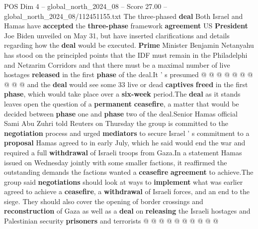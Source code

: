 \begin{textsample}{POS Dim 4 – global\_north\_2024\_08 – Score 27.00 – global\_north\_2024\_08/112451155.txt}
The three-phased \textbf{deal} Both Israel and Hamas have \textbf{accepted} the \textbf{three-phase} framework \textbf{agreement} US \textbf{President} Joe Biden unveiled on May 31, but have inserted clarifications and details regarding how the \textbf{deal} would be executed. \textbf{Prime} Minister Benjamin Netanyahu has stood on the principled points that the IDF must remain in the Philadelphi and Netzarim Corridors and that there must be a maximal number of live hostages \textbf{released} in the first \textbf{phase} of the deal.It ' s presumed @ @ @ @ @ @ @ @ @ @ and the \textbf{deal} would see some 33 live or dead \textbf{captives} \textbf{freed} in the first \textbf{phase}, which would take place over a \textbf{six-week} period.The \textbf{deal} as it stands leaves open the question of a \textbf{permanent} \textbf{ceasefire}, a matter that would be decided between \textbf{phase} one and \textbf{phase} two of the deal.Senior Hamas official Sami Abu Zuhri told Reuters on Thursday the group is committed to the \textbf{negotiation} process and urged \textbf{mediators} to secure Israel ' s commitment to a \textbf{proposal} Hamas agreed to in early July, which he said would end the war and required a full \textbf{withdrawal} of Israeli troops from Gaza.In a statement Hamas issued on Wednesday jointly with some smaller factions, it reaffirmed the outstanding demands the factions wanted a \textbf{ceasefire} \textbf{agreement} to achieve.The group said \textbf{negotiations} should look at ways to \textbf{implement} what was earlier agreed to achieve a \textbf{ceasefire}, a \textbf{withdrawal} of Israeli forces, and an end to the siege.
They should also cover the opening of border crossings and \textbf{reconstruction} of Gaza as well as a \textbf{deal} on \textbf{releasing} the Israeli hostages and Palestinian security \textbf{prisoners} and terrorists @ @ @ @ @ @ @ @ @ @

\end{textsample}
